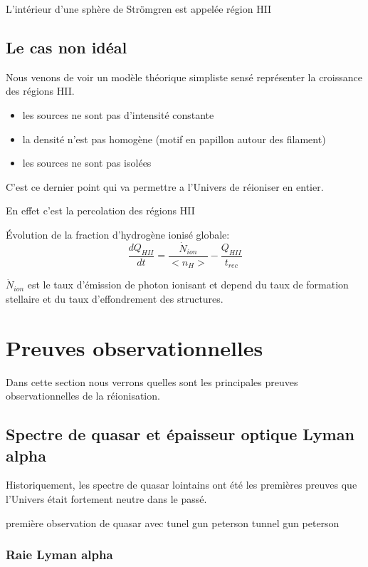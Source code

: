 L'intérieur d'une sphère de Strömgren est appelée région HII


\subsection{Le cas non idéal}
Nous venons de voir un modèle théorique simpliste sensé représenter la croissance des régions HII.

\begin{itemize}
\item les sources ne sont pas d'intensité constante
\item la densité n'est pas homogène (motif en papillon autour des filament)
\item les sources ne sont pas isolées
\end{itemize}

C'est ce dernier point qui va permettre a l'Univers de réioniser en entier.

En effet c'est la percolation des régions HII 


Évolution de la fraction d'hydrogène ionisé globale:
\begin{equation}
\frac{dQ_{HII}}{dt} = \frac{\dot{N}_{ion}}{ <n_H>} - \frac{Q_{HII}}{t_{rec}}
\end{equation}

$\dot{N}_{ion}$  est le taux d'émission de photon ionisant et depend du taux de formation stellaire et du taux d’effondrement des structures.

\section{Preuves observationnelles}
Dans cette section nous verrons quelles sont les principales preuves observationnelles de la réionisation.

\subsection{Spectre de quasar et épaisseur optique Lyman alpha}

Historiquement, les spectre de quasar lointains ont été les premières preuves que l'Univers était fortement neutre dans le passé.

première observation de quasar avec tunel gun peterson \cite{1965ApJ...141.1295S}
tunnel gun peterson \cite{1965ApJ...142.1633G} 

\subsubsection{Raie Lyman alpha}

